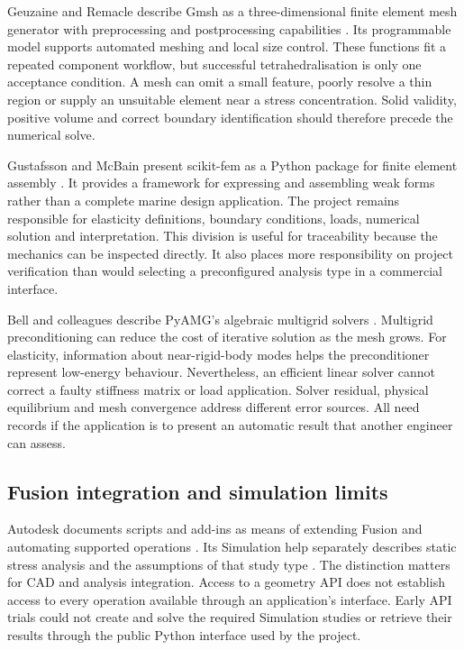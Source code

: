 Geuzaine and Remacle describe Gmsh as a three-dimensional finite element mesh generator with preprocessing and postprocessing capabilities \cite{gmsh2009}. Its programmable model supports automated meshing and local size control. These functions fit a repeated component workflow, but successful tetrahedralisation is only one acceptance condition. A mesh can omit a small feature, poorly resolve a thin region or supply an unsuitable element near a stress concentration. Solid validity, positive volume and correct boundary identification should therefore precede the numerical solve.

Gustafsson and McBain present scikit-fem as a Python package for finite element assembly \cite{skfem2020}. It provides a framework for expressing and assembling weak forms rather than a complete marine design application. The project remains responsible for elasticity definitions, boundary conditions, loads, numerical solution and interpretation. This division is useful for traceability because the mechanics can be inspected directly. It also places more responsibility on project verification than would selecting a preconfigured analysis type in a commercial interface.

Bell and colleagues describe PyAMG's algebraic multigrid solvers \cite{pyamg2023}. Multigrid preconditioning can reduce the cost of iterative solution as the mesh grows. For elasticity, information about near-rigid-body modes helps the preconditioner represent low-energy behaviour. Nevertheless, an efficient linear solver cannot correct a faulty stiffness matrix or load application. Solver residual, physical equilibrium and mesh convergence address different error sources. All need records if the application is to present an automatic result that another engineer can assess.

\subsection{Fusion integration and simulation limits}
\label{sec:lit-fusion}

Autodesk documents scripts and add-ins as means of extending Fusion and automating supported operations \cite{autodeskAddins}. Its Simulation help separately describes static stress analysis and the assumptions of that study type \cite{autodeskStaticStress}. The distinction matters for CAD and analysis integration. Access to a geometry API does not establish access to every operation available through an application's interface. Early API trials could not create and solve the required Simulation studies or retrieve their results through the public Python interface used by the project.

